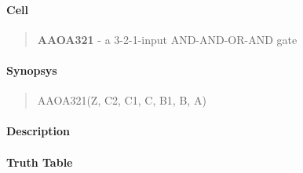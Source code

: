 \label{AAOA321}
\paragraph{Cell}
\begin{quote}
    \textbf{AAOA321} - a 3-2-1-input AND-AND-OR-AND gate
\end{quote}

\paragraph{Synopsys}
\begin{quote}
    AAOA321(Z, C2, C1, C, B1, B, A)
\end{quote}

\paragraph{Description}

%

\paragraph{Truth Table}
%

